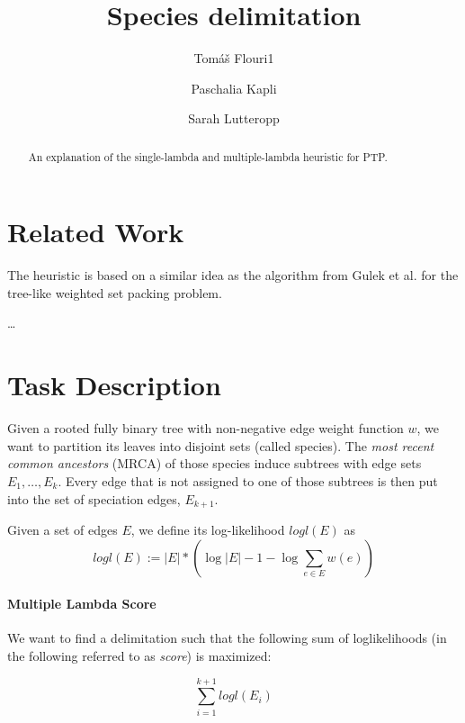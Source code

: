 \documentclass{llncs}
\begin{document}
\title{Species delimitation}


\author{Tom\'{a}\v{s} Flouri1 \and Paschalia Kapli \and Sarah Lutteropp}

\maketitle

\begin{abstract}
An explanation of the single-lambda and multiple-lambda heuristic for PTP.
\end{abstract}

\section{Related Work}

The heuristic is based on a similar idea as the algorithm from Gulek et al.\cite{Gulek:2010:DPA:1838770.1839019} for the tree-like weighted set packing problem.

\ldots

\section{Task Description}

Given a rooted fully binary tree with non-negative edge weight function $w$, we want to partition its leaves into disjoint sets (called species). The \emph{most recent common ancestors} (MRCA) of those species induce subtrees with edge sets $E_1, \ldots, E_{k}$. Every edge that is not assigned to one of those subtrees is then put into the set of speciation edges, $E_{k+1}$.

Given a set of edges $E$, we define its log-likelihood $logl(E)$ as
$$logl(E) := |E| * (\log{|E|} - 1 - \log{\sum_{e \in E} w(e)})$$

\paragraph{Multiple Lambda Score}

We want to find a delimitation such that the following sum of loglikelihoods (in the following referred to as \emph{score}) is maximized:

$$\sum_{i=1}^{k+1}{logl(E_i)}$$
\end{document}
